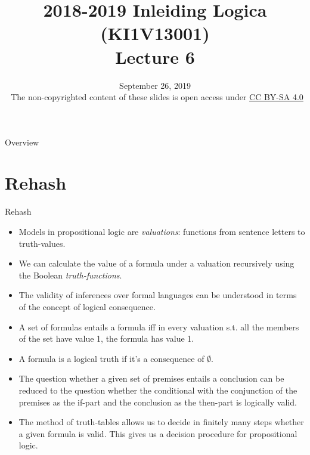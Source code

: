 \documentclass[../slides.tex]{subfiles}
\title{2018-2019 Inleiding Logica (KI1V13001) \\ Lecture 6}
\date{September 26, 2019\\[2ex] {\tiny \textcopyright~The non-copyrighted content of these slides is open access under \href{https://creativecommons.org/licenses/by-sa/4.0/}{CC BY-SA 4.0}}}
\begin{document}
\setcounter{framenumber}{163}
\begin{frame}
	\maketitle
\end{frame}

\begin{frame}{Overview}
\tableofcontents
\end{frame}

\section{Rehash}
\begin{frame}{Rehash}
	
 \begin{itemize}

	\item Models in propositional logic are \emph{valuations}: functions from sentence letters to truth-values.
	
	\item We can calculate the value of a formula under a valuation recursively using the Boolean \emph{truth-functions}.
	
	\item The validity of inferences over formal languages can be understood in terms of the concept of logical consequence.
	
	\item \alert{A set of formulas entails a formula iff in every valuation s.t. all the members of the set have value 1, the formula has value 1.}
	
	\item \alert{A formula is a logical truth if it's a consequence of $\emptyset$.}
	
	\item The question whether a given set of premises entails a conclusion can be reduced to the question whether the conditional with the conjunction of the premises as the if-part and the conclusion as the then-part is logically valid.
		
	\item The method of truth-tables allows us to decide in finitely many steps whether a given formula is valid. This gives us a decision procedure for propositional logic.
	
	
\end{itemize}

\end{frame}
		
\end{document}
